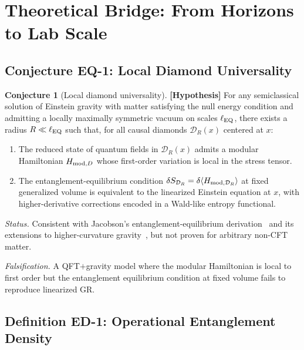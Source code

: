 \documentclass[12pt,letterpaper]{article}
\theoremstyle{definition}
\newtheorem{conjecture}[theorem]{Conjecture}
\theoremstyle{remark}
\newcommand{\hypothesis}{\textbf{[Hypothesis]}}
\begin{document}
\section{Theoretical Bridge: From Horizons to Lab Scale}
\label{sec:bridge}

\subsection{Conjecture EQ-1: Local Diamond Universality}

\begin{conjecture}[Local diamond universality] \label{conj:EQ1}
\hypothesis{}
For any semiclassical solution of Einstein gravity with matter satisfying the null energy
condition and admitting a locally maximally symmetric vacuum on scales $\ell_{\rm EQ}$,
there exists a radius $R \ll \ell_{\rm EQ}$ such that, for all causal diamonds
$\mathcal{D}_R(x)$ centered at $x$:
\begin{enumerate}
\item The reduced state of quantum fields in $\mathcal{D}_R(x)$ admits a modular
      Hamiltonian $H_{{\rm mod},D}$ whose first-order variation is local in the stress
      tensor.
\item The entanglement-equilibrium condition
      $\delta S_{\mathcal{D}_R} = \delta\langle H_{{\rm mod},\mathcal{D}_R}\rangle$
      at fixed generalized volume is equivalent to the linearized Einstein equation
      at $x$, with higher-derivative corrections encoded in a Wald-like entropy
      functional.
\end{enumerate}
\end{conjecture}

\textit{Status.} Consistent with Jacobson's entanglement-equilibrium
derivation~\cite{jacobson2016} and its extensions to higher-curvature
gravity~\cite{bueno2017}, but not proven for arbitrary non-CFT matter.

\textit{Falsification.} A QFT$+$gravity model where the modular Hamiltonian is local to
first order but the entanglement equilibrium condition at fixed volume fails to reproduce
linearized GR.

\subsection{Definition ED-1: Operational Entanglement Density}
\end{document}
